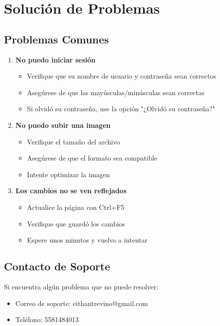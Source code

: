 \documentclass[12pt,letterpaper]{report}
\begin{document}
\chapter{Solución de Problemas}

\section{Problemas Comunes}
\begin{enumerate}
    \item \textbf{No puedo iniciar sesión}
        \begin{itemize}
            \item Verifique que su nombre de usuario y contraseña sean correctos
            \item Asegúrese de que las mayúsculas/minúsculas sean correctas
            \item Si olvidó su contraseña, use la opción "¿Olvidó su contraseña?"
        \end{itemize}
    
    \item \textbf{No puedo subir una imagen}
        \begin{itemize}
            \item Verifique el tamaño del archivo
            \item Asegúrese de que el formato sea compatible
            \item Intente optimizar la imagen
        \end{itemize}
    
    \item \textbf{Los cambios no se ven reflejados}
        \begin{itemize}
            \item Actualice la página con Ctrl+F5
            \item Verifique que guardó los cambios
            \item Espere unos minutos y vuelva a intentar
        \end{itemize}
\end{enumerate}

\section{Contacto de Soporte}
Si encuentra algún problema que no puede resolver:
\begin{tcolorbox}[colback=warning!15,colframe=warning]
\begin{itemize}
    \item Correo de soporte: eithantrevino@gmail.com
    \item Teléfono: 5581484013
\end{itemize}
\end{tcolorbox}
\end{document}
